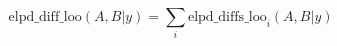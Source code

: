 \documentclass[preview]{standalone}
\begin{document}
\begin{equation}
\tag{1}
    \mathrm{elpd\_diff\_loo} ( A , B | y ) = \sum_{i} {\mathrm{elpd\_diffs\_loo}}_{i} ( A , B | y )
\end{equation}
\end{document}
